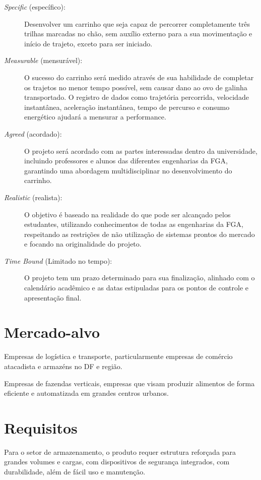 \begin{description}
    \item [\textit{Specific} (específico):] Desenvolver um carrinho que seja capaz de percorrer completamente três trilhas marcadas no chão, sem auxílio externo para a sua movimentação e início de trajeto, exceto para ser iniciado.
    \item [\textit{Measurable} (mensurável):] O sucesso do carrinho será medido através de sua habilidade de completar os trajetos no menor tempo possível, sem causar dano ao ovo de galinha transportado. O registro de dados como trajetória percorrida, velocidade instantânea, aceleração instantânea, tempo de percurso e consumo energético ajudará a mensurar a performance.
    \item [\textit{Agreed} (acordado):] O projeto será acordado com as partes interessadas dentro da universidade, incluindo professores e alunos das diferentes engenharias da FGA, garantindo uma abordagem multidisciplinar no desenvolvimento do carrinho.
    \item [\textit{Realistic} (realista):] O objetivo é baseado na realidade do que pode ser alcançado pelos estudantes, utilizando conhecimentos de todas as engenharias da FGA, respeitando as restrições de não utilização de sistemas prontos do mercado e focando na originalidade do projeto.
    \item [\textit{Time Bound} (Limitado no tempo):] O projeto tem um prazo determinado para sua finalização, alinhado com o calendário acadêmico e as datas estipuladas para os pontos de controle e apresentação final.
\end{description}


\section{Mercado-alvo}  

Empresas de logística e transporte, particularmente empresas de comércio atacadista e armazéns no DF e região. 

Empresas de fazendas verticais, empresas que visam produzir alimentos de forma eficiente e automatizada em grandes centros urbanos. 

\section{Requisitos} 

Para o setor de armazenamento, o produto requer estrutura reforçada para grandes volumes e cargas, com dispositivos de segurança integrados, com durabilidade, além de fácil uso e manutenção.  

